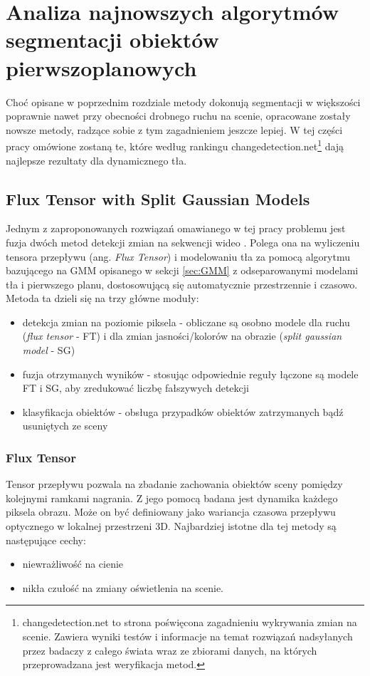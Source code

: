 \renewcommand{\algorithmcfname}{Algorytm}
\chapter{Analiza najnowszych algorytmów segmentacji obiektów pierwszoplanowych}
\label{cha:analiza}

Choć opisane w poprzednim rozdziale metody dokonują segmentacji w większości poprawnie nawet przy obecności drobnego ruchu na scenie, opracowane zostały nowsze metody, radzące sobie z tym zagadnieniem jeszcze lepiej. W tej części pracy omówione zostaną te, które według rankingu changedetection.net\footnote{changedetection.net to strona poświęcona zagadnieniu wykrywania zmian na scenie. Zawiera wyniki testów i informacje na temat rozwiązań nadsyłanych przez badaczy z całego świata wraz ze zbiorami danych, na których przeprowadzana jest weryfikacja metod.} dają najlepsze rezultaty dla dynamicznego tła. 


\section{Flux Tensor with Split Gaussian Models}
\label{sec:FTSG}

Jednym z zaproponowanych rozwiązań omawianego w tej pracy problemu jest fuzja dwóch metod detekcji zmian na sekwencji wideo \cite{6910016}. Polega ona na wyliczeniu tensora przepływu (ang. \textit{Flux Tensor}) i modelowaniu tła za pomocą algorytmu bazującego na GMM opisanego w sekcji \ref{sec:GMM} z odseparowanymi modelami tła i pierwszego planu, dostosowującą się automatycznie przestrzennie i czasowo.
Metoda ta dzieli się na trzy główne moduły:
\begin{itemize}
\item detekcja zmian na poziomie piksela - obliczane są osobno modele dla ruchu (\textit{flux tensor} - FT) i dla zmian jasności/kolorów na obrazie (\textit{split gaussian model} - SG)
\item fuzja otrzymanych wyników - stosując odpowiednie reguły łączone są modele FT i SG, aby zredukować liczbę fałszywych detekcji
\item klasyfikacja obiektów - obsługa przypadków obiektów zatrzymanych bądź usuniętych ze sceny
\end{itemize}
\subsection{Flux Tensor}
\label{sec:FT}
Tensor przepływu pozwala na zbadanie zachowania obiektów sceny pomiędzy kolejnymi ramkami nagrania. Z jego pomocą badana jest dynamika każdego piksela obrazu. Może on być definiowany jako wariancja czasowa przepływu optycznego w lokalnej przestrzeni 3D. Najbardziej istotne dla tej metody są następujące cechy:
\begin{itemize}
\item niewrażliwość na cienie
\item nikła czułość na zmiany oświetlenia na scenie.
\end{itemize} 
